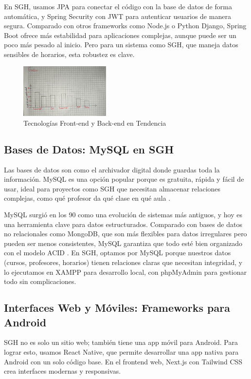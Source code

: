 En SGH, usamos JPA para conectar el código con la base de datos de forma automática, y Spring Security con JWT para autenticar usuarios de manera segura. Comparado con otros frameworks como Node.js o Python Django, Spring Boot ofrece más estabilidad para aplicaciones complejas, aunque puede ser un poco más pesado al inicio. Pero para un sistema como SGH, que maneja datos sensibles de horarios, esta robustez es clave.

\begin{figure}[h]
    \centering
    \includegraphics[width=0.4\textwidth]{graphics/tecnologias frontend y backend en tendencia.png}
    \caption{Tecnologías Front-end y Back-end en Tendencia}
    \label{fig:tecnologias}
\end{figure}



\subsection{Bases de Datos: MySQL en SGH}
Las bases de datos son como el archivador digital donde guardas toda la información. MySQL es una opción popular porque es gratuita, rápida y fácil de usar, ideal para proyectos como SGH que necesitan almacenar relaciones complejas, como qué profesor da qué clase en qué aula \cite{lozano2018}.

MySQL surgió en los 90 como una evolución de sistemas más antiguos, y hoy es una herramienta clave para datos estructurados. Comparado con bases de datos no relacionales como MongoDB, que son más flexibles para datos irregulares pero pueden ser menos consistentes, MySQL garantiza que todo esté bien organizado con el modelo ACID \cite{saltos2022}. En SGH, optamos por MySQL porque nuestros datos (cursos, profesores, horarios) tienen relaciones claras que necesitan integridad, y lo ejecutamos en XAMPP para desarrollo local, con phpMyAdmin para gestionar todo sin complicaciones.

\subsection{Interfaces Web y Móviles: Frameworks para Android}
SGH no es solo un sitio web; también tiene una app móvil para Android. Para lograr esto, usamos React Native, que permite desarrollar una app nativa para Android con un solo código base. En el frontend web, Next.js con Tailwind CSS crea interfaces modernas y responsivas.

